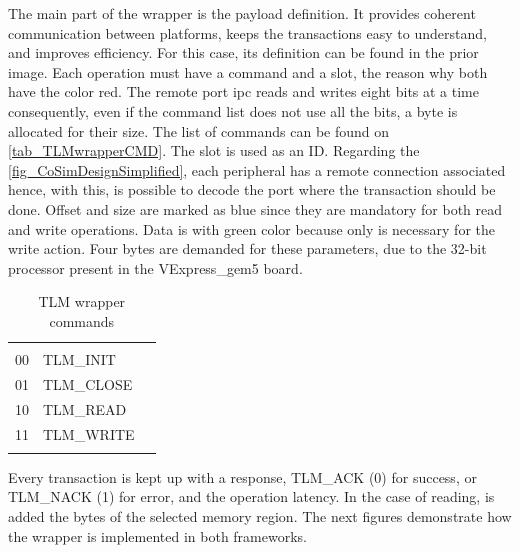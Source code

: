 The main part of the wrapper is the payload definition. It provides coherent communication between platforms, keeps the transactions
easy to understand, and improves efficiency. For this case, its definition can be found in the prior image. Each operation must 
have a command and a slot, the reason why both have the color red. The remote port \gls{ipc} reads and writes eight bits at a time 
consequently, even if the command list does not use all the bits, a byte is allocated for their size. The list of commands can be found on
\autoref{tab_TLMwrapperCMD}. The slot is used as an ID. Regarding the \autoref{fig_CoSimDesignSimplified}, each peripheral has a remote 
connection associated hence, with this, is possible to decode the port where the transaction should be done. Offset and size are 
marked as blue since they are mandatory for both read and write operations. 
Data is with green color because only is necessary for the write action. Four bytes are demanded for these parameters, due to the 32-bit
processor present in the VExpress\_gem5 board.

\begin{table}[h!]
	\centering
	\begin{tabular}{lll}
	\cline{1-2}
	\multicolumn{1}{|l|}{\cellcolor[HTML]{C0C0C0}{\color[HTML]{000000} Bits}} & \multicolumn{1}{l|}{\cellcolor[HTML]{C0C0C0}{\color[HTML]{000000} Command}} &  \\ \cline{1-2}
	\multicolumn{1}{|l|}{00} & \multicolumn{1}{l|}{TLM\_INIT} &  \\ \cline{1-2}
	\multicolumn{1}{|l|}{01} & \multicolumn{1}{l|}{TLM\_CLOSE} &  \\ \cline{1-2}
	\multicolumn{1}{|l|}{10} & \multicolumn{1}{l|}{TLM\_READ} &  \\ \cline{1-2}
	\multicolumn{1}{|l|}{11} & \multicolumn{1}{l|}{TLM\_WRITE} &  \\ \cline{1-2}
	 &  & 
	\end{tabular}%
	\caption{TLM wrapper commands}
	\label{tab_TLMwrapperCMD}
\end{table}

Every transaction is kept up with a response, TLM\_ACK (0) for success, or TLM\_NACK (1) for error, and the operation latency. 
In the case of reading, is added the bytes of the selected memory region. The next figures demonstrate how the wrapper is implemented in both 
frameworks.

